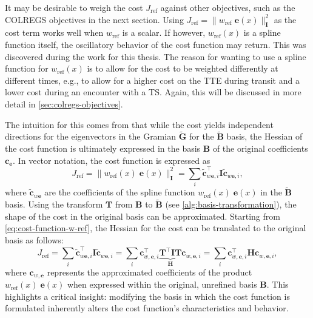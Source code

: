 It may be desirable to weigh the cost $J_\text{ref}$ against other objectives, such as the COLREGS objectives in the next section.
Using $J_\text{ref}=\| w_\text{ref}\;\mathbf e(x)\|_{\mathbf I}^2$ as the cost term works well when $w_\text{ref}$ is a scalar. If however, $w_\text{ref}(x)$ is a spline function itself, the oscillatory behavior of the cost function may return. This was discovered during the work for this thesis. The reason for wanting to use a spline function for $w_\text{ref}(x)$ is to allow for the cost to be weighted differently at different times, e.g., to allow for a higher cost on the TTE during transit and a lower cost during an encounter with a \acrshort{TS}. Again, this will be discussed in more detail in \cref{sec:colregs-objectives}.

The intuition for this comes from that while the cost yields independent directions for the eigenvectors in the Gramian $\mathbf{\tilde G}$ for the $\mathbf{\tilde B}$ basis, the Hessian of the cost function is ultimately expressed in the basis $\mathbf B$ of the original coefficients $\mathbf c_\mathbf e$. In vector notation, the cost function is expressed as
\begin{equation}\label{eq:cost-function-w-ref}
    J_\text{ref} = \|w_\text{ref}(x)\;\mathbf e(x)\|_{\mathbf I}^2 = \sum_i \mathbf{\tilde c}_{w \mathbf{e},i}^\top \mathbf I \mathbf{\tilde c}_{w \mathbf{e},i},
\end{equation}
where $\mathbf{\tilde c}_{w \mathbf{e}}$ are the coefficients of the spline function $w_\text{ref}(x)\;\mathbf e(x)$ in the $\mathbf{\tilde B}$ basis.  Using the transform $\mathbf T$ from $\mathbf B$ to $\mathbf{\tilde B}$ (see \cref{alg:basis-transformation}), the shape of the cost in the original basis can be approximated. Starting from \cref{eq:cost-function-w-ref}, the Hessian for the cost can be translated to the original basis as follows:
\begin{equation}\label{eq:cost-function-w-ref-derivation}
        J_\text{ref} = \sum_i \mathbf{\tilde c}_{w \mathbf{e},i}^\top \mathbf I \mathbf{\tilde c}_{w \mathbf{e},i} 
        = \sum_i \mathbf c_{w,\mathbf e,i}^\top \underbrace{\mathbf T^\top \mathbf I \mathbf T}_{\mathbf H} \mathbf c_{w,\mathbf e,i} 
        = \sum_i \mathbf c_{w,\mathbf e,i}^\top \mathbf H \mathbf c_{w,\mathbf e,i},
\end{equation}
where $\mathbf c_{w,\mathbf e}$ represents the approximated coefficients of the product $w_\text{ref}(x)\;\mathbf e(x)$ when expressed within the original, unrefined basis $\mathbf B$. This highlights a critical insight: modifying the basis in which the cost function is formulated inherently alters the cost function's characteristics and behavior.

